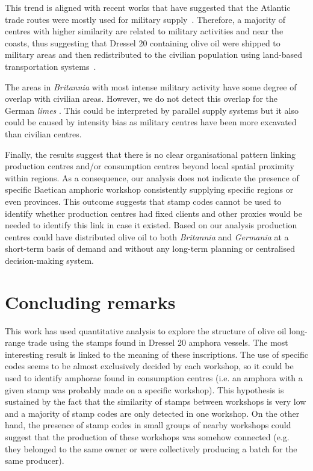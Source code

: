 This trend is aligned with recent works that have suggested that the Atlantic trade routes were mostly used for military supply~\citep{remesal_annona_1986,remesal_provincial_2008,carreras_atlantic_2012,morillo_hispania_2016}. Therefore, a majority of centres with higher similarity are related to military activities and near the coasts, thus suggesting that Dressel 20 containing olive oil were shipped to military areas and then redistributed to the civilian population using land-based transportation systems~\citep{carreras_britannia_1998,orengo_seeds_2016,ayllon_olive_2018}.
 
The areas in \textit{Britannia} with most intense military activity have some degree of overlap with civilian areas. However, we do not detect this overlap for the German \textit{limes} \citep{xanten2018}. This could be interpreted by parallel supply systems but it also could be caused by intensity bias as military centres have been more excavated than civilian centres.

Finally, the results suggest that there is no clear organisational pattern linking production centres and/or consumption centres beyond local spatial proximity within regions. As a consequence, our analysis does not indicate the presence of specific Baetican amphoric workshop consistently supplying specific regions or even provinces. This outcome suggests that stamp codes cannot be used to identify whether production centres had fixed clients and other proxies would be needed to identify this link in case it existed. Based on our analysis production centres could have distributed olive oil to both \textit{Britannia} and \textit{Germania} at a short-term basis of demand and without any long-term planning or centralised decision-making system.

\section{Concluding remarks}
\label{sec:8}

This work has used quantitative analysis to explore the structure of olive oil long-range trade using the stamps found in Dressel 20 amphora vessels. The most interesting result is linked to the meaning of these inscriptions. The use of specific codes seems to be almost exclusively decided by each workshop, so it could be used to identify amphorae found in consumption centres (i.e. an amphora with a given stamp was probably made on a specific workshop). This hypothesis is sustained by the fact that the similarity of stamps between workshops is very low and a majority of stamp codes are only detected in one workshop. On the other hand, the presence of stamp codes in small groups of nearby workshops could suggest that the production of these workshops was somehow connected (e.g. they belonged to the same owner or were collectively producing a batch for the same producer).
 

